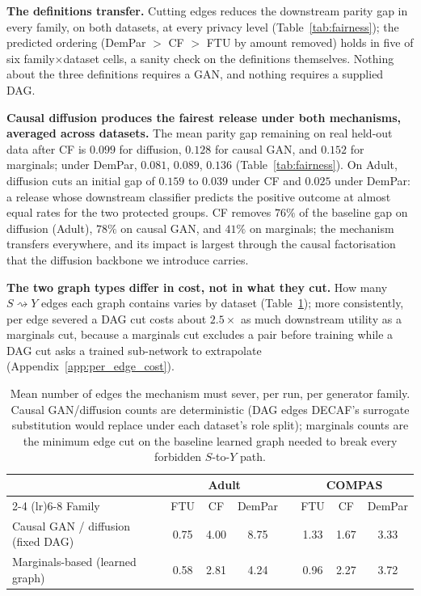 \documentclass{article}
\begin{document}


\textbf{The definitions transfer.} Cutting edges reduces the downstream
parity gap in every family, on both datasets, at every privacy level
(Table~\ref{tab:fairness}); the predicted ordering (DemPar $>$ CF $>$ FTU by
amount removed) holds in five of six family$\times$dataset cells, a sanity
check on the definitions themselves. Nothing about the three definitions
requires a GAN, and nothing requires a supplied DAG.

\textbf{Causal diffusion produces the fairest release under both mechanisms,
averaged across datasets.} The mean parity gap remaining on real held-out
data after CF is $0.099$ for diffusion, $0.128$ for causal GAN, and $0.152$
for marginals; under DemPar, $0.081$, $0.089$, $0.136$
(Table~\ref{tab:fairness}). On Adult, diffusion cuts an initial gap of
$0.159$ to $0.039$ under CF and $0.025$ under DemPar: a release whose
downstream classifier predicts the positive outcome at almost equal rates
for the two protected groups. CF removes $76\%$ of the baseline gap on
diffusion (Adult), $78\%$ on causal GAN, and $41\%$ on marginals; the
mechanism transfers everywhere, and its impact is largest through the causal
factorisation that the diffusion backbone we introduce carries.

\textbf{The two graph types differ in cost, not in what they cut.} How many
$S \rightsquigarrow Y$ edges each graph contains varies by dataset
(Table~\ref{tab:edges}); more consistently, per edge severed a DAG cut costs
about $2.5\times$ as much downstream utility as a marginals cut, because a
marginals cut excludes a pair before training while a DAG cut asks a trained
sub-network to extrapolate (Appendix~\ref{app:per_edge_cost}).

\begin{table}[t]
  \caption{Mean number of edges the mechanism must sever, per run, per
  generator family. Causal GAN/diffusion counts are deterministic (DAG edges
  DECAF's surrogate substitution would replace under each dataset's role
  split); marginals counts are the minimum edge cut on the baseline learned
  graph needed to break every forbidden $S$-to-$Y$ path.}
  \label{tab:edges}
  \centering
  \footnotesize
  \setlength{\tabcolsep}{6pt}
  \begin{tabular}{l ccc c ccc}
    \toprule
    & \multicolumn{3}{c}{\textbf{Adult}} & & \multicolumn{3}{c}{\textbf{COMPAS}} \\
    \cmidrule(lr){2-4} \cmidrule(lr){6-8}
    Family & FTU & CF & DemPar & & FTU & CF & DemPar \\
    \midrule
    Causal GAN / diffusion (fixed DAG) & 0.75 & 4.00 & 8.75 & & 1.33 & 1.67 & 3.33 \\
    Marginals-based (learned graph)   & 0.58 & 2.81 & 4.24 & & 0.96 & 2.27 & 3.72 \\
    \bottomrule
  \end{tabular}
\end{table}
\end{document}
